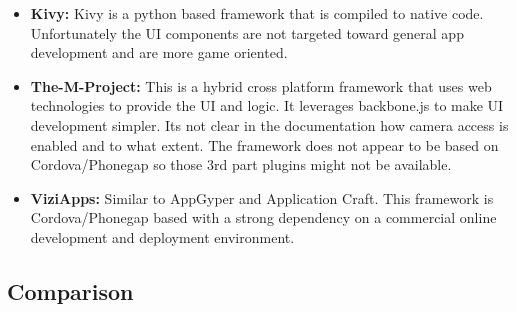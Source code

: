 \begin{itemize}[label={}]
\item \textbf{Kivy:} Kivy is a python based framework that is compiled to native code. Unfortunately the UI components are not targeted toward general app development and are more game oriented.

\item \textbf{The-M-Project:} This is a hybrid cross platform framework that uses web technologies to provide the UI and logic. It leverages backbone.js to make UI development simpler. Its not clear in the documentation how camera access is enabled and to what extent. The framework does not appear to be based on Cordova/Phonegap so those 3rd part plugins might not be available.

\item \textbf{ViziApps:} Similar to AppGyper and Application Craft. This framework is Cordova/Phonegap based with a strong dependency on a commercial online development and deployment environment.

\end{itemize}

\subsection{Comparison}

